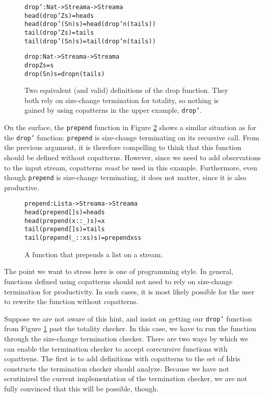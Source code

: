 \begin{figure}
\begin{alltt}
drop' : Nat -> Stream a -> Stream a
head (drop' Z     s) = head s
head (drop' (S n) s) = head (drop' n (tail s))
tail (drop' Z     s) = tail s
tail (drop' (S n) s) = tail (drop' n (tail s))

drop : Nat -> Stream a -> Stream a
drop Z     s = s
drop (S n) s = drop n (tail s)
\end{alltt}
\caption{Two equivalent (and valid) definitions of the drop function. They both rely on size-change termination for totality, so nothing is gained by using copatterns in the upper example, \texttt{drop'}.}
\label{fig:drop_drop'}
\end{figure}

On the surface, the \texttt{prepend} function in Figure \ref{fig:prepend} shows a similar situation as for the \texttt{drop'} function: \texttt{prepend} is size-change terminating on its recursive call. From the previous argument, it is therefore compelling to think that this function should be defined without copatterns. However, since we need to add observations to the input stream, copatterns \emph{must} be used in this example. Furthermore, even though \texttt{prepend} is size-change terminating, it does not matter, since it is also productive.

\begin{figure}
\begin{alltt}
prepend : List a -> Stream a -> Stream a
head (prepend []      s) = head s
head (prepend (x::_)  s) = x
tail (prepend []      s) = tail s
tail (prepend (_::xs) s) = prepend xs s
\end{alltt}
\caption{A function that prepends a list on a stream.}
\label{fig:prepend}
\end{figure}

The point we want to stress here is one of programming style. In general, functions defined using copatterns should not need to rely on size-change termination for productivity. In such cases, it is most likely possible for the user to rewrite the function without copatterns. 

Suppose we are not aware of this hint, and insist on getting our \texttt{drop'} function from Figure \ref{fig:drop_drop'} past the totality checker. In this case, we have to run the function through the size-change termination checker. There are two ways by which we can enable the termination checker to accept corecursive functions with copatterns. The first is to add definitions with copatterns to the set of Idris constructs the termination checker should analyze. Because we have not scrutinized the current implementation of the termination checker, we are not fully convinced that this will be possible, though.

